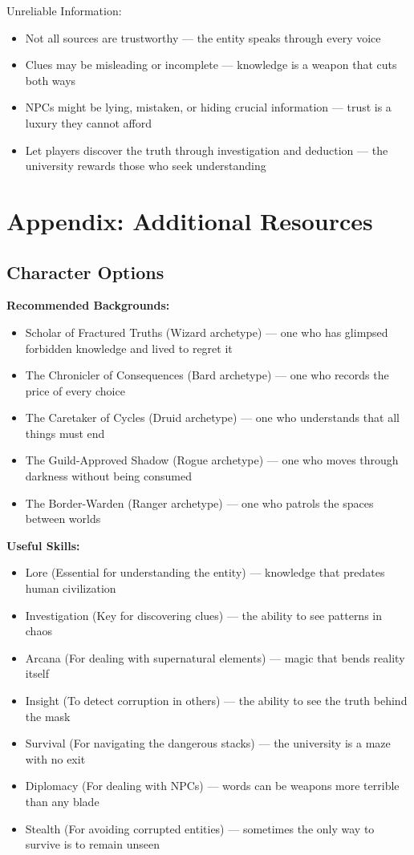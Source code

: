 \documentclass[11pt]{article}
\begin{document}
Unreliable Information:
\begin{itemize}
\item Not all sources are trustworthy --- the entity speaks through every voice
\item Clues may be misleading or incomplete --- knowledge is a weapon that cuts both ways
\item NPCs might be lying, mistaken, or hiding crucial information --- trust is a luxury they cannot afford
\item Let players discover the truth through investigation and deduction --- the university rewards those who seek understanding
\end{itemize}

\section{Appendix: Additional Resources}

\subsection{Character Options}

\textbf{Recommended Backgrounds:}
\begin{itemize}
\item Scholar of Fractured Truths (Wizard archetype) --- one who has glimpsed forbidden knowledge and lived to regret it
\item The Chronicler of Consequences (Bard archetype) --- one who records the price of every choice
\item The Caretaker of Cycles (Druid archetype) --- one who understands that all things must end
\item The Guild-Approved Shadow (Rogue archetype) --- one who moves through darkness without being consumed
\item The Border-Warden (Ranger archetype) --- one who patrols the spaces between worlds
\end{itemize}

\textbf{Useful Skills:}
\begin{itemize}
\item Lore (Essential for understanding the entity) --- knowledge that predates human civilization
\item Investigation (Key for discovering clues) --- the ability to see patterns in chaos
\item Arcana (For dealing with supernatural elements) --- magic that bends reality itself
\item Insight (To detect corruption in others) --- the ability to see the truth behind the mask
\item Survival (For navigating the dangerous stacks) --- the university is a maze with no exit
\item Diplomacy (For dealing with NPCs) --- words can be weapons more terrible than any blade
\item Stealth (For avoiding corrupted entities) --- sometimes the only way to survive is to remain unseen
\end{itemize}
\end{document}
